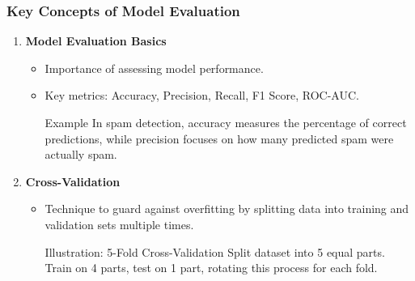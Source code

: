 \documentclass[aspectratio=169]{beamer}
\begin{document}
\begin{frame}[fragile]
    \frametitle{Key Concepts of Model Evaluation}
    \begin{enumerate}
        \item \textbf{Model Evaluation Basics}
            \begin{itemize}
                \item Importance of assessing model performance.
                \item Key metrics: Accuracy, Precision, Recall, F1 Score, ROC-AUC.
                
                \begin{block}{Example}
                    In spam detection, accuracy measures the percentage of correct predictions, while precision focuses on how many predicted spam were actually spam.
                \end{block}
            \end{itemize}
        
        \item \textbf{Cross-Validation}
            \begin{itemize}
                \item Technique to guard against overfitting by splitting data into training and validation sets multiple times.
                
                \begin{block}{Illustration: 5-Fold Cross-Validation}
                    Split dataset into 5 equal parts. Train on 4 parts, test on 1 part, rotating this process for each fold.
                \end{block}
            \end{itemize}
    \end{enumerate}
\end{frame}
\end{document}
